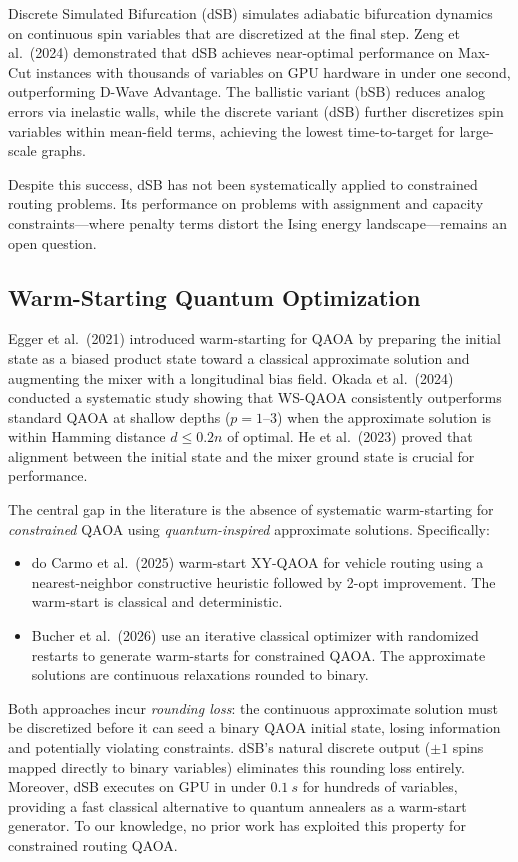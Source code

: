 \documentclass[11pt,a4paper]{article}
\theoremstyle{definition}
\begin{document}
Discrete Simulated Bifurcation (dSB) simulates adiabatic bifurcation dynamics on continuous spin variables that are discretized at the final step. Zeng et al.\ (2024) demonstrated that dSB achieves near-optimal performance on Max-Cut instances with thousands of variables on GPU hardware in under one second, outperforming D-Wave Advantage. The ballistic variant (bSB) reduces analog errors via inelastic walls, while the discrete variant (dSB) further discretizes spin variables within mean-field terms, achieving the lowest time-to-target for large-scale graphs.

Despite this success, dSB has not been systematically applied to constrained routing problems. Its performance on problems with assignment and capacity constraints---where penalty terms distort the Ising energy landscape---remains an open question.

\subsection{Warm-Starting Quantum Optimization}

Egger et al.\ (2021) introduced warm-starting for QAOA by preparing the initial state as a biased product state toward a classical approximate solution and augmenting the mixer with a longitudinal bias field. Okada et al.\ (2024) conducted a systematic study showing that WS-QAOA consistently outperforms standard QAOA at shallow depths ($p=1$--$3$) when the approximate solution is within Hamming distance $d \leq 0.2n$ of optimal. He et al.\ (2023) proved that alignment between the initial state and the mixer ground state is crucial for performance.

The central gap in the literature is the absence of systematic warm-starting for \emph{constrained} QAOA using \emph{quantum-inspired} approximate solutions. Specifically:
\begin{itemize}
    \item do Carmo et al.\ (2025) warm-start XY-QAOA for vehicle routing using a nearest-neighbor constructive heuristic followed by 2-opt improvement. The warm-start is classical and deterministic.
    \item Bucher et al.\ (2026) use an iterative classical optimizer with randomized restarts to generate warm-starts for constrained QAOA. The approximate solutions are continuous relaxations rounded to binary.
\end{itemize}
Both approaches incur \emph{rounding loss}: the continuous approximate solution must be discretized before it can seed a binary QAOA initial state, losing information and potentially violating constraints. dSB's natural discrete output ($\pm 1$ spins mapped directly to binary variables) eliminates this rounding loss entirely. Moreover, dSB executes on GPU in under $\SI{0.1}{s}$ for hundreds of variables, providing a fast classical alternative to quantum annealers as a warm-start generator. To our knowledge, no prior work has exploited this property for constrained routing QAOA.
\end{document}

